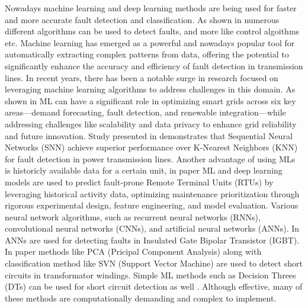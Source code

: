 \documentclass[11pt]{IEEEtran}
\begin{document}
Nowadays machine learning and deep learning methods are being used for faster and more accurate fault detection and classification. As shown in \cite{9787450} numerous different algorithms can be used to detect faults, and more like control algoithms etc.
Machine learning has emerged as a powerful and nowadays popular tool for automatically extracting complex patterns from data, offering the potential to significantly enhance the accuracy and efficiency of fault detection in transmission lines. In recent years, there has been a notable surge in research focused on leveraging machine learning algorithms to address challenges in this domain. 
As shown in \cite{10709384} ML can have a significant role in optimizing smart grids across six key areas—demand forecasting, fault detection, and renewable integration—while addressing challenges like scalability and data privacy to enhance grid reliability and future innovation.
Study presented in \cite{10435012} demonstrates that Sequential Neural Networks (SNN) achieve superior performance over K-Nearest Neighbors (KNN) for fault detection in power transmission lines.
Another advantage of using MLs is historicly available data for a certain unit, in paper \cite{10129641} ML and deep learning models are used to predict fault-prone Remote Terminal Units (RTUs) by leveraging historical activity data, optimizing maintenance prioritization through rigorous experimental design, feature engineering, and model evaluation.
Various neural network algorithms, such as recurrent neural networks (RNNs)\cite{9498552}, convolutional neural networks (CNNs), and artificial neural networks (ANNs). In \cite{9493498} ANNs are used for detecting faults in Insulated Gate Bipolar Transistor (IGBT). 
In paper \cite{10409468} methods like PCA (Pricipal Component Analysis) along with classification method like SVN (Support Vector Machine) are used to detect short circuits in transformator windings.
Simple ML methods such as Decision Threes (DTs) can be used for short circuit detection as well \cite{9264078}.
Although effective, many of these methods are computationally demanding and complex to implement. 
\end{document}
